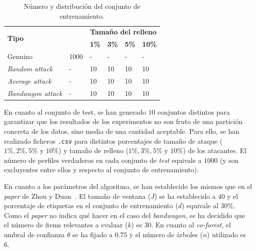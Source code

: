 \begin{table}
	\begin{centering}
		\begin{tabular}{@{} p{8em} p{7em} p{3em} p{3em} p{3em} p{3em} @{}}
			\toprule
			\multirow{2}{*}{\hfil \textbf{Tipo}} & \hfil\multirow{2}{*}{\textbf{Número}} & \multicolumn{4}{c}{\hfil \textbf{Tamaño del relleno}} \\ \cmidrule{3-6}
			&\hfil   &\hfil \textbf{1\%} &\hfil \textbf{3\%} & \hfil \textbf{5\%} & \hfil \textbf{10\%}\\ 
			\toprule
			Genuino &\hfil 1000&\hfil -	& \hfil -  & \hfil - & \hfil -\\
			\textit{Random attack} &\hfil-	&\hfil 10 & \hfil 10	&  \hfil 10 & \hfil 10\\
			\textit{Average attack} &\hfil-	& \hfil 10 & \hfil 10 & \hfil 10 & \hfil 10 \\
			\textit{Bandwagon attack} &\hfil- & \hfil 10 & \hfil 10 & \hfil 10 & \hfil10 
			\\ \bottomrule
		\end{tabular}
	\end{centering}
	\caption[Sistemas de recomendación: descripción de los conjuntos]{Número y distribución del conjunto de entrenamiento.}
	\label{tbl:entrenamiento_ML10M}	
\end{table}

En cuanto al conjunto de test, se han generado $10$ conjuntos distintos para garantizar que los resultados de los experimentos no son fruto de una partición concreta de los datos, sino media de una cantidad aceptable. Para ello, se han realizado ficheros \texttt{.csv} para distintos porcentajes de tamaño de ataque ($1\%, 2\%, 5\%$ y $10\%$) y tamaño de relleno ($1\%, 3\%, 5\%$ y $10\%$) de los atacantes. El número de perfiles verdaderos en cada conjunto de \textit{test} equivale a $1000$ (y son excluyentes entre ellos y respecto al conjunto de entrenamiento).

En cuanto a los parámetros del algoritmo, se han establecido los mismos que en el \textit{paper} de Zhou y Duan~\cite{zhou2021SemisupervisedRecommendationAttack}. El tamaño de ventana ($J$) se ha establecido a 40 y el porcentaje de etiquetas en el conjunto de entrenamiento ($d$) equivale al $30\%$. Como el \textit{paper} no indica qué hacer en el caso del \textit{bandwagon}, se ha decidido que el número de ítems relevantes a evaluar ($k$) es 30. En cuanto al \textit{co-forest}, el umbral de confianza $\theta$ se ha fijado a $0$.$75$ y el número de árboles ($n$) utilizado es 6.

